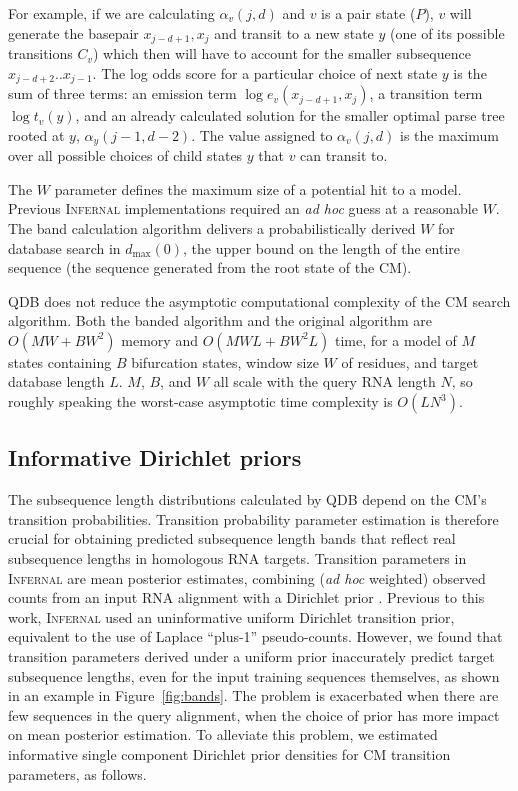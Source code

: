 \documentclass[11pt]{article}
\begin{document}
For example, if we are calculating $\alpha_v(j,d)$ and $v$ is a pair
state ($P$), $v$ will generate the basepair $x_{j-d+1},x_j$ and
transit to a new state $y$ (one of its possible transitions $C_v$)
which then will have to account for the smaller subsequence
$x_{j-d+2}..x_{j-1}$. The log odds score for a particular choice of
next state $y$ is the sum of three terms: an emission term $\log
e_v(x_{j-d+1},x_j)$, a transition term $\log t_v(y)$, and an already
calculated solution for the smaller optimal parse tree rooted at $y$,
$\alpha_y(j-1,d-2)$. The value assigned to $\alpha_v(j, d)$ is the
maximum over all possible choices of child states $y$ that $v$ can
transit to.

The $W$ parameter defines the maximum size of a potential hit to a
model. Previous \textsc{Infernal} implementations required an \emph{ad
hoc} guess at a reasonable $W$. The band calculation algorithm
delivers a probabilistically derived $W$ for database search in
$d_{\mbox{max}}(0)$, the upper bound on the length of the entire
sequence (the sequence generated from the root state of the CM).

QDB does not reduce the asymptotic computational complexity of the CM
search algorithm.  Both the banded algorithm and the original
algorithm are $O(MW + BW^2)$ memory and $O(MWL + BW^2L)$ time, for a
model of $M$ states containing $B$ bifurcation states, window size $W$
of residues, and target database length $L$.  $M$, $B$, and $W$ all
scale with the query RNA length $N$, so roughly speaking the
worst-case asymptotic time complexity is $O(L N^3)$.


\subsection{Informative Dirichlet priors}

The subsequence length distributions calculated by QDB depend on the
CM's transition probabilities. Transition probability parameter
estimation is therefore crucial for obtaining predicted subsequence
length bands that reflect real subsequence lengths in homologous RNA
targets. Transition parameters in \textsc{Infernal} are mean posterior
estimates, combining (\emph{ad hoc} weighted) observed counts from an
input RNA alignment with a Dirichlet prior \cite{infguide03}.
Previous to this work, \textsc{Infernal} used an uninformative uniform
Dirichlet transition prior, equivalent to the use of Laplace
``plus-1'' pseudo-counts. However, we found that transition parameters
derived under a uniform prior inaccurately predict target subsequence
lengths, even for the input training sequences themselves, as shown in
an example in Figure~\ref{fig:bands}.  The problem is exacerbated when
there are few sequences in the query alignment, when the choice of
prior has more impact on mean posterior estimation.  To alleviate this
problem, we estimated informative single component Dirichlet prior
densities for CM transition parameters, as follows.
\end{document}
